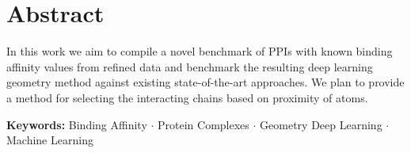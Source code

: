 \section{Abstract}
In this work we aim to compile a novel benchmark of PPIs with known binding affinity values from refined data and benchmark the resulting deep learning geometry method against existing state-of-the-art approaches.
We plan to provide a method for selecting the interacting chains based on proximity of atoms.

\textbf{Keywords:}
    Binding Affinity $\cdotp$
    Protein Complexes $\cdotp$
    Geometry Deep Learning $\cdotp$
    Machine Learning
